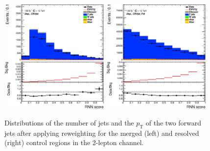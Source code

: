 \begin{figure}[ht]
    \includegraphics[width=0.48\textwidth]{figures/2lep/reweighting/after_reweighting/C_0ptag1pfat0pjet_0ptv_CRVjet_RNNScoreMerged_Lin.eps}
    \includegraphics[width=0.48\textwidth]{figures/2lep/reweighting/after_reweighting/C_0ptag2pjet_0ptv_CRVjet_Fid_RNNScoreResolved_Lin.eps}
    \caption{ Distributions of the number of jets and the $p_\mathrm{T}$ of the two forward jets after applying reweighting for the merged (left) and resolved (right) control regions in the 2-lepton channel.}
    \label{fig:after_rw}
\end{figure}
%

